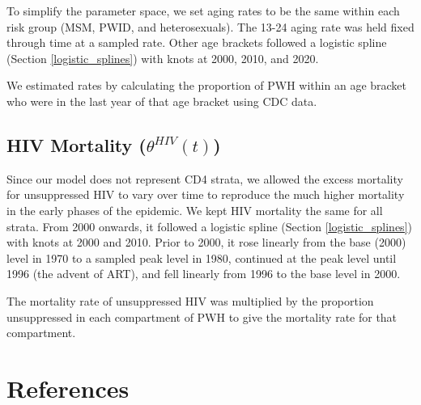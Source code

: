 \documentclass{article}
\begin{document}
To simplify the parameter space, we set aging rates to be the same within each risk group (MSM, PWID, and heterosexuals). The 13-24 aging rate was held fixed through time at a sampled rate. Other age brackets followed a logistic spline (Section \ref{logistic_splines}) with knots at 2000, 2010, and 2020.

We estimated rates by calculating the proportion of PWH within an age bracket who were in the last year of that age bracket using CDC data.

\subsection{HIV Mortality \big($\theta^{HIV}(t)$\big)}\label{mortality}

Since our model does not represent CD4 strata, we allowed the excess mortality for unsuppressed HIV to vary over time to reproduce the much higher mortality in the early phases of the epidemic. We kept HIV mortality the same for all strata. From 2000 onwards, it followed a logistic spline (Section \ref{logistic_splines}) with knots at 2000 and 2010. Prior to 2000, it rose linearly from the base (2000) level in 1970 to a sampled peak level in 1980, continued at the peak level until 1996 (the advent of ART), and fell linearly from 1996 to the base level in 2000.

The mortality rate of unsuppressed HIV was multiplied by the proportion unsuppressed in each compartment of PWH to give the mortality rate for that compartment.




\newpage
\section{References}



\end{document}
